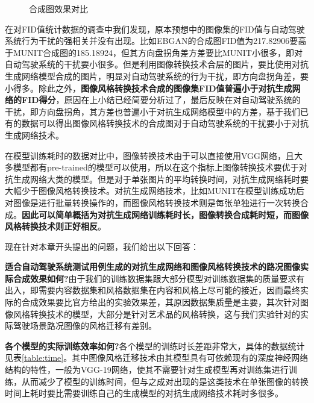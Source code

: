 \begin{figure}[h]
    \centering
    \caption{合成图效果对比}
    \label{fig:new}
\end{figure}

在对FID值统计数据的调查中我们发现，原本预想中的图像集的FID值与自动驾驶系统行为干扰的强相关并没有出现。比如EBGAN的合成图FID值为217.82906要高于MUNIT合成图的185.18924，但其方向盘拐角差方差要比MUNIT小很多，即对自动驾驶系统的干扰要小很多。但是利用图像转换技术合层的图片，要比使用对抗生成网络模型合成的图片，明显对自动驾驶系统的行为干扰，即方向盘拐角差，要小得多。除此之外，\textbf{图像风格转换技术合成的图像集FID值普遍小于对抗生成网络的FID得分}，原因在上小结已经简要分析过了，最后反映在对自动驾驶系统的干扰，即方向盘拐角，其方差也普遍小于对抗生成网络模型中的方差，基于我们已有的数据可以得出图像风格转换技术的合成图对于自动驾驶系统的干扰要小于对抗生成网络技术。

在模型训练耗时的数据对比中，图像转换技术由于可以直接使用VGG网络，且大多模型都有pre-trained的模型可以使用，所以在这个指标上图像转换技术要优于对抗生成网络大类的模型。但是对于单张图片的平均转换时间，对抗生成网络耗时要大幅少于图像风格转换技术。对抗生成网络技术，比如MUNIT在模型训练成功后对图像是进行批量转换操作的，而图像风格转换技术则是每张单独进行一次转换合成。\textbf{因此可以简单概括为对抗生成网络训练耗时长，图像转换合成耗时短，而图像风格转换技术则正好相反}。

现在针对本章开头提出的问题，我们给出以下回答：

\textbf{适合自动驾驶系统测试用例生成的对抗生成网络和图像风格转换技术的路况图像实际合成效果如何?}\quad 由于我们的训练数据集跟大部分模型对训练数据集的质量要求有出入，即需要内容数据集和风格数据集在内容和风格上尽可能的接近，因而最终实际的合成效果要比官方给出的实验效果差，其原因数据集质量是主要，其次针对图像风格转换技术的模型，大部分是针对艺术品的风格转换，这与我们实验针对的实际驾驶场景路况图像的风格迁移有差别。

\textbf{各个模型的实际训练效率如何?}\quad 各个模型的训练时长差距非常大，具体的数据统计见表\ref{table:time}。其中图像风格迁移技术由其模型具有可依赖现有的深度神经网络结构的特性，一般为VGG-19网络，使其不需要针对生成模型再对训练集进行训练，从而减少了模型的训练时间，但与之成对出现的是这类技术在单张图像的转换时间上耗时要比需要训练自己的生成模型的对抗生成网络技术耗时多很多。

